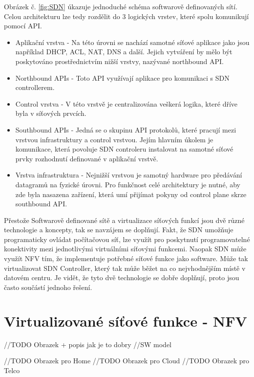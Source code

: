 Obrázek č. \ref{fig:SDN} úkazuje jednoduché schéma softwarově definovaných sítí. Celou architekturu lze tedy rozdělit do 3 logických vrstev, které spolu komunikují pomocí API. 

\begin{itemize}
\item Aplikační vrstva - Na této úrovni se nachází samotné síťové aplikace jako jsou například DHCP, ACL, NAT, DNS a další. Jejich vytváření by
mělo být poskytováno prostřednictvím nižší vrstvy, nazývané northbound API.
\item Northbound APIs - Toto API využívají aplikace pro komunikaci s SDN controllerem. 
\item Control vrstva - V této vrstvě je centralizována veškerá logika, které dříve byla v síťových prvcích.
\item Southbound APIs - Jedná se o skupinu API protokolů, které pracují mezi vrstvou infrastruktury a control vrstvou. Jejím hlavním úkolem je komunikace, která povoluje SDN controleru instalovat na samotné síťové prvky rozhodnutí definované v aplikační vrstvě.
\item Vrstva infrastruktura - Nejnižší vrstvou je samotný hardware pro předávání datagramů na fyzické úrovni. Pro funkčnost celé architektury je nutné, aby zde byla nasazena zařízení, která umí přijímat pokyny od control plane skrze southbound API.

\end{itemize}

Přestože Softwarově definované sítě a virtualizace síťových funkcí jsou dvě různé technologie a koncepty, tak se navzájem se doplňují. Fakt, že SDN umožňuje programaticky ovládat počítačovou síť, lze využít pro poskytnutí programovatelné konektivity mezi jednotlivými virtuálními síťovými funkcemi. Naopak SDN může využít NFV tím, že implementuje potřebné síťové funkce jako software. Může tak virtualizovat SDN Controller, který tak může běžet na co nejvhodnějším místě v datovém centru. Je vidět, že tyto dvě technologie se dobře doplňují, proto jsou často součástí jednoho řešení. \cite{SDN_book}


\section{Virtualizované síťové funkce - NFV}

//TODO Obrazek + popis jak je to dobry
//SW model

//TODO Obrazek pro Home
//TODO Obrazek pro Cloud
//TODO Obrazek pro Telco

